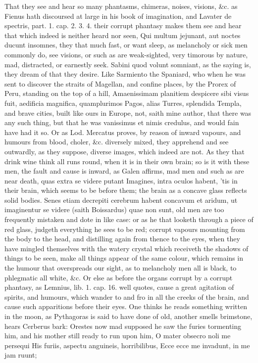 {That they see and hear so many phantasms, chimeras, noises, visions,
\&c. as Fienus hath discoursed at large in his book of imagination, and
 Lavater de spectris, part. 1. cap. 2. 3. 4. their corrupt
phantasy makes them see and hear that which indeed is neither heard nor
seen, Qui multum jejunant, aut noctes ducunt insomnes, they that much
fast, or want sleep, as melancholy or sick men commonly do, see
visions, or such as are weak-sighted, very timorous by nature, mad,
distracted, or earnestly seek. Sabini quod volunt somniant, as the
saying is, they dream of that they desire. Like Sarmiento the Spaniard,
who when he was sent to discover the straits of Magellan, and confine
places, by the Prorex of Peru, standing on the top of a hill,
Amaenissimam planitiem despicere sibi visus fuit, aedificia magnifica,
quamplurimos Pagos, alias Turres, splendida Templa, and brave cities,
built like ours in Europe, not, saith mine author, that there was
any such thing, but that he was vanissimus et nimis credulus, and would
fain have had it so. Or as Lod. Mercatus proves, by reason of
inward vapours, and humours from blood, choler, \&c. diversely mixed,
they apprehend and see outwardly, as they suppose, diverse images, which
indeed are not. As they that drink wine think all runs round, when it
is in their own brain; so is it with these men, the fault and cause is
inward, as Galen affirms, mad men and such as are near death,
quas extra se videre putant Imagines, intra oculos habent, 'tis in
their brain, which seems to be before them; the brain as a concave
glass reflects solid bodies. Senes etiam decrepiti cerebrum habent
concavum et aridum, ut imaginentur se videre (saith Boissardus)
quae non sunt, old men are too frequently mistaken and dote in like
case: or as he that looketh through a piece of red glass, judgeth
everything he sees to be red; corrupt vapours mounting from the body to
the head, and distilling again from thence to the eyes, when they have
mingled themselves with the watery crystal which receiveth the shadows
of things to be seen, make all things appear of the same colour, which
remains in the humour that overspreads our sight, as to melancholy men
all is black, to phlegmatic all white, \&c. Or else as before the organs
corrupt by a corrupt phantasy, as Lemnius, lib. 1. cap. 16. well
quotes, cause a great agitation of spirits, and humours, which
wander to and fro in all the creeks of the brain, and cause such
apparitions before their eyes. One thinks he reads something written in
the moon, as Pythagoras is said to have done of old, another smells
brimstone, hears Cerberus bark: Orestes now mad supposed he saw the
furies tormenting him, and his mother still ready to run upon him,
O mater obsecro noli me persequi
His furiis, aspectu anguineis, horribilibus,
Ecce ecce me invadunt, in me jam ruunt;

}
